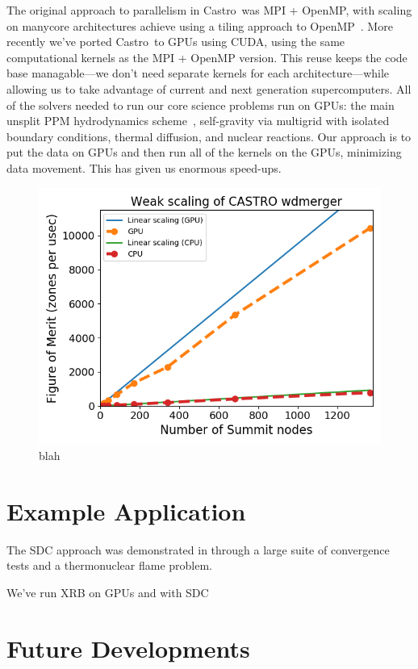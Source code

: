\documentclass[a4paper]{jpconf}
\newcommand{\castro}{{\sffamily Castro}}
\begin{document}
The original approach to parallelism in \castro\ was MPI + OpenMP,
with scaling on manycore architectures achieve using a tiling approach
to OpenMP~\cite{tiling}.  More recently we've ported \castro\ to GPUs
using CUDA, using the same computational kernels as the MPI + OpenMP
version.  This reuse keeps the code base managable---we don't need
separate kernels for each architecture---while allowing us to take
advantage of current and next generation supercomputers.  All of the
solvers needed to run our core science problems run on GPUs: the main
unsplit PPM hydrodynamics scheme~\cite{ppm,millercolella:2002}, self-gravity via multigrid with
isolated boundary conditions, thermal diffusion, and nuclear
reactions.  Our approach is to put the data on GPUs and then run all
of the kernels on the GPUs, minimizing data movement.  This has given
us enormous speed-ups.

\begin{figure}[t]
\centering
\includegraphics[width=0.8\linewidth]{wdmerger_gpu}
\caption{\label{fig:gpu} blah}
\end{figure}

\section{Example Application}

The SDC approach was demonstrated in \cite{castro:sdc} through a large
suite of convergence tests and a thermonuclear flame problem.  

We've run XRB on GPUs and with SDC


\section{Future Developments}
\end{document}
